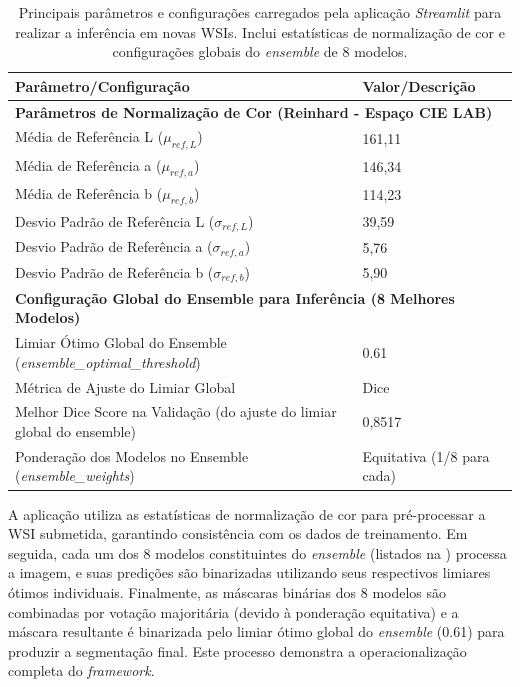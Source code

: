 \begin{table}[!htb]
\centering
\caption[Parâmetros e Configurações para Inferência do \textit{framework}.]{Principais parâmetros e configurações carregados pela aplicação \textit{Streamlit} para realizar a inferência em novas WSIs. Inclui estatísticas de normalização de cor e configurações globais do \textit{ensemble} de 8 modelos.}
\label{tab:parametros_inferencia_framework}
\begin{tabular}{l p{}} %
\toprule
\textbf{Parâmetro/Configuração} & \textbf{Valor/Descrição} \\
\midrule
\multicolumn{2}{l}{\textbf{Parâmetros de Normalização de Cor (Reinhard - Espaço CIE LAB)}} \\
\quad Média de Referência L\* ($\mu_{ref, L}$) & 161,11 \\
\quad Média de Referência a\* ($\mu_{ref, a}$) & 146,34 \\
\quad Média de Referência b\* ($\mu_{ref, b}$) & 114,23 \\
\quad Desvio Padrão de Referência L\* ($\sigma_{ref, L}$) & 39,59 \\
\quad Desvio Padrão de Referência a\* ($\sigma_{ref, a}$) & 5,76 \\
\quad Desvio Padrão de Referência b\* ($\sigma_{ref, b}$) & 5,90 \\
\midrule
\multicolumn{2}{l}{\textbf{Configuração Global do Ensemble para Inferência (8 Melhores Modelos)}} \\
Limiar Ótimo Global do Ensemble (\textit{ensemble\_optimal\_threshold}) & 0.61 \\
Métrica de Ajuste do Limiar Global & Dice \\
Melhor Dice Score na Validação (do ajuste do limiar global do ensemble) & 0,8517 \\
Ponderação dos Modelos no Ensemble (\textit{ensemble\_weights}) & Equitativa (1/8 para cada) \\
\bottomrule
\end{tabular}
\end{table}

A aplicação utiliza as estatísticas de normalização de cor para pré-processar a WSI submetida, garantindo consistência com os dados de treinamento. Em seguida, cada um dos 8 modelos constituintes do \textit{ensemble} (listados na ) processa a imagem, e suas predições são binarizadas utilizando seus respectivos limiares ótimos individuais. Finalmente, as máscaras binárias dos 8 modelos são combinadas por votação majoritária (devido à ponderação equitativa) e a máscara resultante é binarizada pelo limiar ótimo global do \textit{ensemble} (0.61) para produzir a segmentação final. Este processo demonstra a operacionalização completa do \textit{framework}.


